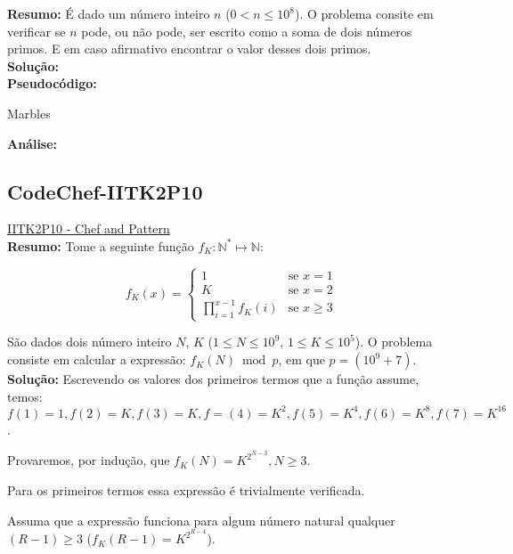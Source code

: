 \textbf{Resumo:}
É dado um número inteiro $n$ ($0 < n \leq 10^8$). O problema consite em verificar se $n$ pode, ou não pode, ser escrito como a soma de dois números primos.
E em caso afirmativo encontrar o valor desses dois primos.
\\

\textbf{Solução:}
\\

\textbf{Pseudocódigo:}
\begin{algorithm}
\caption{Marbles}
\begin{algorithmic}[1]

\EndProcedure
\end{algorithmic}
\end{algorithm}


\textbf{Análise:}



\subsection{CodeChef-IITK2P10}
\href{https://www.codechef.com/problems/IITK2P10}{IITK2P10 - Chef and Pattern}\\


\textbf{Resumo:}
Tome a seguinte função $f_K:\mathbb{N}^* \longmapsto \mathbb{N}$:

\[
 f_K(x) = 
  \begin{cases} 
   1 & \text{se } x = 1 \\
   K & \text{se } x = 2 \\
   \prod_{i=1}^{x-1}f_K(i) & \text{se } x \geq 3
  \end{cases}
\]

São dados dois número inteiro $N$, $K$ ($1 \leq N \leq 10^9$, $1 \leq K \leq 10^5$). O problema consiste em calcular a expressão: $f_K(N) \bmod p$, em que $p = (10^9+7)$.
\\

\textbf{Solução:}
Escrevendo os valores dos primeiros termos que a função assume, temos: $f(1)=1, f(2)=K, f(3)=K, f=(4)=K^2, f(5)=K^4, f(6)=K^8, f(7)=K^{16}$.

Provaremos, por indução, que $f_K(N) = K^{2^{N-3}}, N \geq 3$.

Para os primeiros termos essa expressão é trivialmente verificada.

Assuma que a expressão funciona para algum número natural qualquer $(R-1) \geq 3$ ($f_K(R-1) = K^{2^{R-4}}$).

